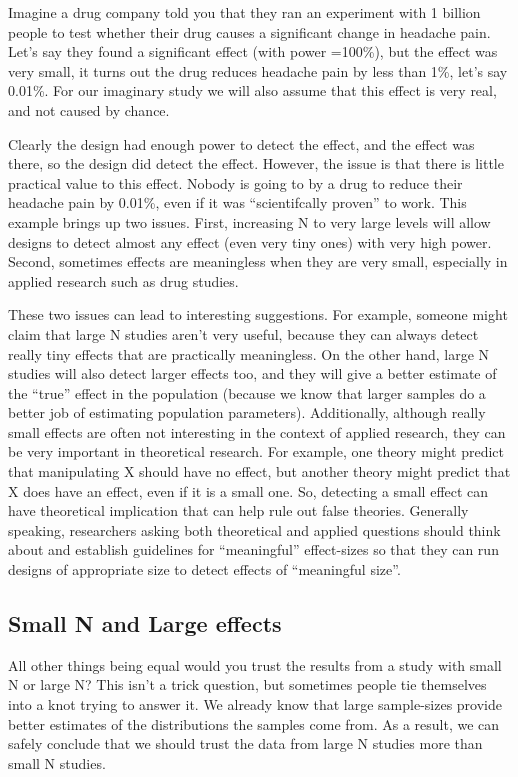 \documentclass[
  letterpaper,
  DIV=11,
  numbers=noendperiod]{scrreprt}
\begin{document}
Imagine a drug company told you that they ran an experiment with 1
billion people to test whether their drug causes a significant change in
headache pain. Let's say they found a significant effect (with power
=100\%), but the effect was very small, it turns out the drug reduces
headache pain by less than 1\%, let's say 0.01\%. For our imaginary
study we will also assume that this effect is very real, and not caused
by chance.

Clearly the design had enough power to detect the effect, and the effect
was there, so the design did detect the effect. However, the issue is
that there is little practical value to this effect. Nobody is going to
by a drug to reduce their headache pain by 0.01\%, even if it was
``scientifcally proven'' to work. This example brings up two issues.
First, increasing N to very large levels will allow designs to detect
almost any effect (even very tiny ones) with very high power. Second,
sometimes effects are meaningless when they are very small, especially
in applied research such as drug studies.

These two issues can lead to interesting suggestions. For example,
someone might claim that large N studies aren't very useful, because
they can always detect really tiny effects that are practically
meaningless. On the other hand, large N studies will also detect larger
effects too, and they will give a better estimate of the ``true'' effect
in the population (because we know that larger samples do a better job
of estimating population parameters). Additionally, although really
small effects are often not interesting in the context of applied
research, they can be very important in theoretical research. For
example, one theory might predict that manipulating X should have no
effect, but another theory might predict that X does have an effect,
even if it is a small one. So, detecting a small effect can have
theoretical implication that can help rule out false theories. Generally
speaking, researchers asking both theoretical and applied questions
should think about and establish guidelines for ``meaningful''
effect-sizes so that they can run designs of appropriate size to detect
effects of ``meaningful size''.

\subsection{Small N and Large effects}\label{small-n-and-large-effects}

All other things being equal would you trust the results from a study
with small N or large N? This isn't a trick question, but sometimes
people tie themselves into a knot trying to answer it. We already know
that large sample-sizes provide better estimates of the distributions
the samples come from. As a result, we can safely conclude that we
should trust the data from large N studies more than small N studies.
\end{document}
